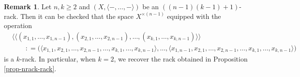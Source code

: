 \documentclass[a4paper,reqno,10pt]{amsart}
\theoremstyle{plain}
\theoremstyle{definition}
\newtheorem{remark}[thm]{Remark}
\theoremstyle{remark}
\begin{document}

\begin{remark}
    Let $n, k \geq 2$ and $(X, \langle -, \ldots, - \rangle)$ be an $((n-1)(k-1)+1)$-rack. Then it can be checked that the space $X^{\times (n-1)}$ equipped with the operation
    \begin{align*}
        &\langle \! \langle  (x_{1,1}, \ldots, x_{1,n-1}),  (x_{2,1}, \ldots, x_{2,n-1}), \ldots, (x_{k,1}, \ldots, x_{k,n-1})    \rangle \! \rangle \\
        & \qquad : = \big(  \langle x_{1,1}, x_{2,1}, \ldots, x_{2,n-1}, \ldots, x_{k,1}, \ldots, x_{k,n-1} \rangle , \ldots, \langle x_{1,n-1}, x_{2,1}, \ldots, x_{2,n-1}, \ldots, x_{k,1}, \ldots, x_{k,n-1} \rangle  \big)
    \end{align*}
    is a $k$-rack. In particular, when $k =2$, we recover the rack obtained in Proposition \ref{prop-nrack-rack}.
\end{remark}
\end{document}
